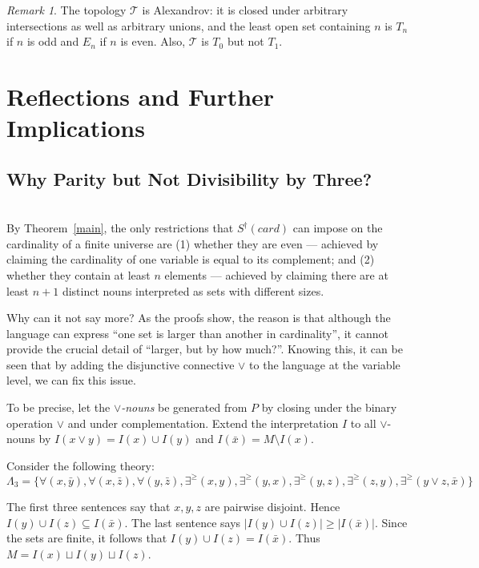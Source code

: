 \documentclass[12pt, reqno]{amsart}
\theoremstyle{definition}
\theoremstyle{remark}
\newtheorem{remark}[theorem]{Remark}
\numberwithin{equation}{section}
\begin{document}
\begin{remark}
The topology $\mathcal{T}$ is Alexandrov: it is closed under arbitrary intersections as
well as arbitrary unions, and the least open set containing $n$ is $T_n$ if $n$ is odd
and $E_n$ if $n$ is even. Also,
$\mathcal{T}$ is $T_0$ but not $T_1$.
\end{remark}








\newpage
\section{Reflections and Further Implications}

\subsection{Why Parity but Not Divisibility by Three?} \hfill \\ 
By Theorem~\ref{main}, the only restrictions that $S^\dagger(card)$ can impose on the cardinality of a finite universe are (1) whether they are even --- achieved by claiming the cardinality of one variable is equal to its complement; and (2) whether they contain at least $n$ elements --- achieved by claiming there are at least $n+1$ distinct nouns interpreted as sets with different sizes. 

Why can it not say more? As the proofs show, the reason is that although the language can express ``one set is larger than another in cardinality'', it cannot provide the crucial detail of ``larger, but by how much?''. Knowing this, it can be seen that by adding the disjunctive connective $\lor$ to the language at the variable level, we can fix this issue. 

To be precise, let the \emph{$\vee$-nouns} be generated from $P$ by closing under the
binary operation $\vee$ and under complementation. Extend the interpretation $I$ to
all $\vee$-nouns by $I(x \vee y) = I(x) \cup I(y)$ and $I(\bar{x}) = M \setminus I(x)$. 

Consider the following theory: \[\Lambda_3= \{
\forall(x,\bar y),
\forall(x,\bar z),
\forall(y,\bar z),
\exists^{\geq}(x,y),
\exists^{\geq}(y,x),
\exists^{\geq}(y,z),
\exists^{\geq}(z,y),
\exists^{\geq}(y\vee z,\bar x)
\}\]

The first three sentences say that $x,y,z$ are pairwise disjoint.
Hence $I(y)\cup I(z)\subseteq I(\bar x).$
The last sentence says $|I(y)\cup I(z)|\geq |I(\bar x)|$. Since the sets are finite, it follows that $I(y)\cup I(z)=I(\bar x).$ Thus $M=I(x)\sqcup I(y)\sqcup I(z).$
\end{document}
